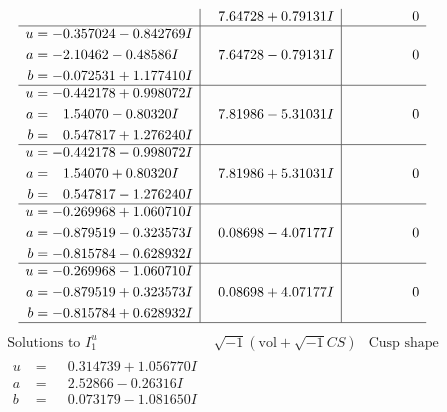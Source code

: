 \documentclass[1p]{elsarticle_modified}
\theoremstyle{definition}
\newcommand{\I}{\sqrt{-1}}
\begin{document}
$$\begin{array}{c|c|c}
 & \phantom{-}7.64728 + 0.79131 I & \phantom{-0.000000 } 0 \\ \hline\begin{aligned}
u &= -0.357024 - 0.842769 I \\
a &= -2.10462 - 0.48586 I \\
b &= -0.072531 + 1.177410 I\end{aligned}
 & \phantom{-}7.64728 - 0.79131 I & \phantom{-0.000000 } 0 \\ \hline\begin{aligned}
u &= -0.442178 + 0.998072 I \\
a &= \phantom{-}1.54070 - 0.80320 I \\
b &= \phantom{-}0.547817 + 1.276240 I\end{aligned}
 & \phantom{-}7.81986 - 5.31031 I & \phantom{-0.000000 } 0 \\ \hline\begin{aligned}
u &= -0.442178 - 0.998072 I \\
a &= \phantom{-}1.54070 + 0.80320 I \\
b &= \phantom{-}0.547817 - 1.276240 I\end{aligned}
 & \phantom{-}7.81986 + 5.31031 I & \phantom{-0.000000 } 0 \\ \hline\begin{aligned}
u &= -0.269968 + 1.060710 I \\
a &= -0.879519 - 0.323573 I \\
b &= -0.815784 - 0.628932 I\end{aligned}
 & \phantom{-}0.08698 - 4.07177 I & \phantom{-0.000000 } 0 \\ \hline\begin{aligned}
u &= -0.269968 - 1.060710 I \\
a &= -0.879519 + 0.323573 I \\
b &= -0.815784 + 0.628932 I\end{aligned}
 & \phantom{-}0.08698 + 4.07177 I & \phantom{-0.000000 } 0\\
 \hline 
 \end{array}$$\newpage$$\begin{array}{c|c|c}  
\text{Solutions to }I^u_{1}& \I (\text{vol} + \sqrt{-1}CS) & \text{Cusp shape}\\
 \hline 
\begin{aligned}
u &= \phantom{-}0.314739 + 1.056770 I \\
a &= \phantom{-}2.52866 - 0.26316 I \\
b &= \phantom{-}0.073179 - 1.081650 I\end{aligned}

\end{array}$$
\end{document}
